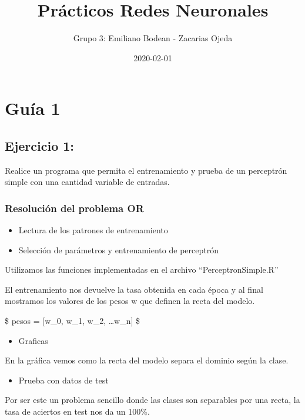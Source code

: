 \documentclass[]{book}
\title{Prácticos Redes Neuronales}
\author{Grupo 3: Emiliano Bodean - Zacarias Ojeda}
\date{2020-02-01}
\providecommand{\tightlist}{%
  \setlength{\itemsep}{0pt}\setlength{\parskip}{0pt}}
\begin{document}
\maketitle

{
\setcounter{tocdepth}{1}
\tableofcontents
}
\hypertarget{guia-1}{%
\chapter{Guía 1}\label{guia-1}}

\hypertarget{ejercicio-1}{%
\section{Ejercicio 1:}\label{ejercicio-1}}

Realice un programa que permita el entrenamiento y prueba de un perceptrón simple con una cantidad variable de entradas.

\hypertarget{resolucion-del-problema-or}{%
\subsection{Resolución del problema OR}\label{resolucion-del-problema-or}}

\begin{itemize}
\item
  Lectura de los patrones de entrenamiento
\item
  Selección de parámetros y entrenamiento de perceptrón
\end{itemize}

Utilizamos las funciones implementadas en el archivo ``PerceptronSimple.R''

El entrenamiento nos devuelve la tasa obtenida en cada época y al final mostramos los valores de los pesos w que definen la recta del modelo.

\$ pesos = {[}w\_0, w\_1, w\_2, \ldots{}w\_n{]} \$

\begin{itemize}
\tightlist
\item
  Graficas
\end{itemize}

En la gráfica vemos como la recta del modelo separa el dominio según la clase.

\begin{itemize}
\tightlist
\item
  Prueba con datos de test
\end{itemize}

Por ser este un problema sencillo donde las clases son separables por una recta, la tasa de aciertos en test nos da un 100\%.
\end{document}
